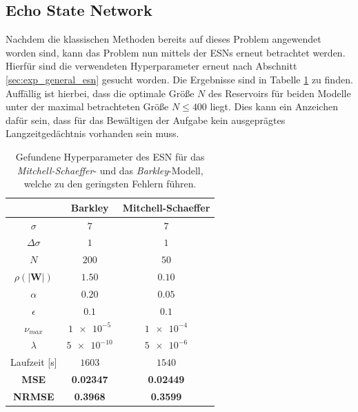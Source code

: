 \FloatBarrier
\subsection{Echo State Network}
Nachdem die klassischen Methoden bereits auf dieses Problem angewendet worden sind, kann das Problem nun mittels der \textsc{ESN}s erneut betrachtet werden. Hierfür sind die verwendeten Hyperparameter erneut nach Abschnitt \ref{sec:exp_general_esn} gesucht worden. Die Ergebnisse sind in Tabelle \ref{tab:exp_unblur_esn_results} zu finden. Auffällig ist hierbei, dass die optimale Größe $N$ des Reservoirs für beiden Modelle unter der maximal betrachteten Größe $N \leq 400$ liegt. Dies kann ein Anzeichen dafür sein, dass für das Bewältigen der Aufgabe kein ausgeprägtes Langzeitgedächtnis vorhanden sein muss. 

\begin{table}[h]
	\centering
	\captionsetup{width=0.9\linewidth}
	\begin{tabular}{|c|c|c|}
		\multicolumn{1}{c|}{} &  Barkley & Mitchell-Schaeffer \\ 
		\hline \hline 
		\rule[-1ex]{0pt}{2.5ex} $\sigma$ & $7$ & $7$ \\ 
		\hline 
		\rule[-1ex]{0pt}{2.5ex} $\Delta \sigma$ & $1$ & $1$ \\ 
		\hline 
		\rule[-1ex]{0pt}{3.5ex} $N$ & $200$ & $50$ \\ 
		\hline 
		\rule[-1ex]{0pt}{3.5ex} $\rho(|\mathbf{W}|)$ & $1.50$ & $0.10$\\ 
		\hline 
		\rule[-1ex]{0pt}{3.5ex} $\alpha$ & $0.20$ & $0.05$ \\ 
		\hline 
		\rule[-1ex]{0pt}{3.5ex} $\epsilon$ & $0.1$ & $0.1$ \\ 
		\hline 
		\rule[-1ex]{0pt}{3.5ex} $\nu_{max}$ & $\num{1e-5}$ & $\num{1e-4}$\\ 
		\hline 
		\rule[-1ex]{0pt}{3.5ex} $\lambda$ & $\num{5e-10}$ & $\num{5e-6}$\\ 
		\hline 
		\rule[-1ex]{0pt}{2.5ex} Laufzeit [s] & $1603$ & $1540$ \\ 
		\hline 
		\rule[-1ex]{0pt}{2.5ex} \textbf{MSE} & \textbf{0.02347} & \textbf{0.02449} \\ 
		\hline
		\rule[-1ex]{0pt}{2.5ex} \textbf{NRMSE} & \textbf{0.3968} & \textbf{0.3599} \\ 
		\hline 
	\end{tabular} 
	\caption{Gefundene Hyperparameter des \textsc{ESN} für das \textit{Mitchell-Schaeffer}- und das \textit{Barkley}-Modell, welche zu den geringsten Fehlern führen.}
	\label{tab:exp_unblur_esn_results}
\end{table}


